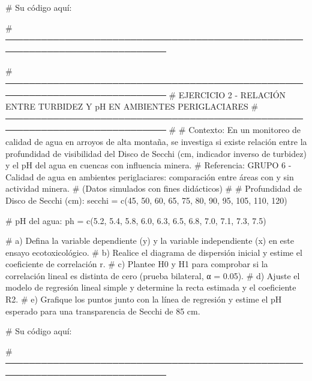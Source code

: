 \documentclass[
  spanish,
  letterpaper,
  DIV=11,
  numbers=noendperiod]{scrreprt}
\newenvironment{Shaded}{\begin{snugshade}}{\end{snugshade}}
\newcommand{\CommentTok}[1]{\textcolor[rgb]{0.37,0.37,0.37}{#1}}
\newcommand{\DecValTok}[1]{\textcolor[rgb]{0.68,0.00,0.00}{#1}}
\newcommand{\FloatTok}[1]{\textcolor[rgb]{0.68,0.00,0.00}{#1}}
\newcommand{\FunctionTok}[1]{\textcolor[rgb]{0.28,0.35,0.67}{#1}}
\newcommand{\NormalTok}[1]{\textcolor[rgb]{0.00,0.23,0.31}{#1}}
\newcommand{\OtherTok}[1]{\textcolor[rgb]{0.00,0.23,0.31}{#1}}
\begin{document}
\begin{Shaded}
\begin{Highlighting}[]
\CommentTok{\# Su código aquí:}

\CommentTok{\# ─────────────────────────────────────────────────────────────────────────────}


\CommentTok{\# ─────────────────────────────────────────────────────────────────────────────}
\CommentTok{\# EJERCICIO 2 {-} RELACIÓN ENTRE TURBIDEZ Y pH EN AMBIENTES PERIGLACIARES}
\CommentTok{\# ─────────────────────────────────────────────────────────────────────────────}
\CommentTok{\#}
\CommentTok{\# Contexto: En un monitoreo de calidad de agua en arroyos de alta montaña, se investiga si existe relación entre la profundidad de visibilidad del Disco de Secchi (cm, indicador inverso de turbidez) y el pH del agua en cuencas con influencia minera.}
\CommentTok{\# Referencia: GRUPO 6 {-} Calidad de agua en ambientes periglaciares: comparación entre áreas con y sin actividad minera.}
\CommentTok{\# (Datos simulados con fines didácticos)}
\CommentTok{\#}
\CommentTok{\# Profundidad de Disco de Secchi (cm):}
\NormalTok{secchi }\OtherTok{=} \FunctionTok{c}\NormalTok{(}\DecValTok{45}\NormalTok{, }\DecValTok{50}\NormalTok{, }\DecValTok{60}\NormalTok{, }\DecValTok{65}\NormalTok{, }\DecValTok{75}\NormalTok{, }\DecValTok{80}\NormalTok{, }\DecValTok{90}\NormalTok{, }\DecValTok{95}\NormalTok{, }\DecValTok{105}\NormalTok{, }\DecValTok{110}\NormalTok{, }\DecValTok{120}\NormalTok{)}

\CommentTok{\# pH del agua:}
\NormalTok{ph }\OtherTok{=} \FunctionTok{c}\NormalTok{(}\FloatTok{5.2}\NormalTok{, }\FloatTok{5.4}\NormalTok{, }\FloatTok{5.8}\NormalTok{, }\FloatTok{6.0}\NormalTok{, }\FloatTok{6.3}\NormalTok{, }\FloatTok{6.5}\NormalTok{, }\FloatTok{6.8}\NormalTok{, }\FloatTok{7.0}\NormalTok{, }\FloatTok{7.1}\NormalTok{, }\FloatTok{7.3}\NormalTok{, }\FloatTok{7.5}\NormalTok{)}

\CommentTok{\# a) Defina la variable dependiente (y) y la variable independiente (x) en este ensayo ecotoxicológico.}
\CommentTok{\# b) Realice el diagrama de dispersión inicial y estime el coeficiente de correlación r.}
\CommentTok{\# c) Plantee H0 y H1 para comprobar si la correlación lineal es distinta de cero (prueba bilateral, α = 0.05).}
\CommentTok{\# d) Ajuste el modelo de regresión lineal simple y determine la recta estimada y el coeficiente R2.}
\CommentTok{\# e) Grafique los puntos junto con la línea de regresión y estime el pH esperado para una transparencia de Secchi de 85 cm.}

\CommentTok{\# Su código aquí:}

\CommentTok{\# ─────────────────────────────────────────────────────────────────────────────}



\end{Highlighting}
\end{Shaded}
\end{document}
